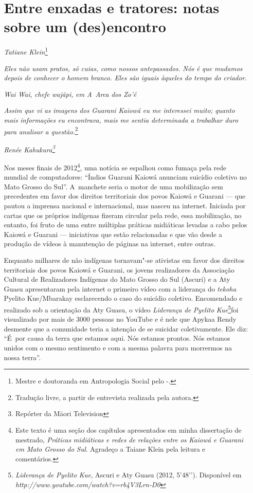 \chapter{Entre enxadas e tratores: notas sobre um (des)encontro}
\begin{flushright}
\emph{Tatiane Klein}\footnote{Mestre e doutoranda em Antropologia Social pelo
-.}
\end{flushright}
\medskip

\emph{Eles não usam pratos, só cuias, como nossos antepassados. Nós é que
mudamos depois de conhecer o homem branco. Eles são iguais àqueles do
tempo do criador.}

\begin{flushright}
\emph{Wai Wai, chefe wajãpi, em \emph{A~Arca dos Zo’é}}
\end{flushright}

\emph{Assim que vi as imagens dos Guarani Kaiowá eu me interessei muito;
quanto mais informações eu encontrava, mais me sentia determinada a
trabalhar duro para analisar a questão.}\footnote{Tradução livre, a
partir de entrevista realizada pela autora.}

\begin{flushright}
\emph{Renée Kahukura\footnote{Repórter da M\=aori Television}}
\end{flushright}

\noindent Nos meses finais de 2012\footnote{Este texto é uma seção dos capítulos
apresentados em minha dissertação de mestrado, \emph{Práticas midiáticas e
redes de relações entre os Kaiowá e Guarani em Mato Grosso do Sul}.
Agradeço a Taiane Klein pela leitura e comentários.}, uma notícia se
espalhou como fumaça pela rede mundial de computadores: ``Índios Guarani
Kaiowá anunciam suicídio coletivo no Mato Grosso do Sul''. A~manchete
seria o motor de uma mobilização sem precedentes em favor dos direitos
territoriais dos povos Kaiowá e Guarani --- que pautou a imprensa
nacional e internacional, mas nasceu na internet. Iniciada por cartas
que os próprios indígenas fizeram circular pela rede, essa mobilização,
no entanto, foi fruto de uma entre múltiplas práticas midiáticas
levadas a cabo pelos Kaiowá e Guarani --- iniciativas que estão
relacionadas e que vão desde a produção de vídeos à manutenção de
páginas na internet, entre outras. 

Enquanto milhares de não indígenas tornavam"-se ativistas em favor dos
direitos territoriais dos povos Kaiowá e Guarani, os jovens
realizadores da Associação Cultural de Realizadores Indígenas do Mato
Grosso do Sul (Ascuri) e a Aty Guasu apresentaram pela internet o
primeiro vídeo com a liderança do \emph{tekoha} Pyelito Kue/Mbarakay
esclarecendo o caso do suicídio coletivo. Encomendado e realizado sob a
orientação da Aty Guasu, o vídeo \emph{Liderança de Pyelito
Kue}\footnote{\emph{Liderança de Pyelito Kue}, Ascuri e Aty Guasu (2012,
5’48’’). Disponível em \emph{http://www.youtube.com/watch?v=rb4V3Lrn-D0}}foi
visualizado por mais de 3000 pessoas no YouTube e é nele que Apykaa
Rendy desmente que a comunidade teria a intenção de se suicidar
coletivamente. Ele diz: ``É~por causa da terra que estamos aqui. Nós
estamos prontos. Nós estamos unidos com o mesmo sentimento e com a
mesma palavra para morrermos na nossa terra''.

